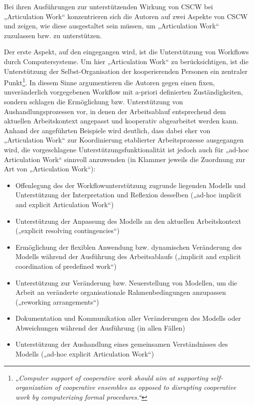 Bei ihren Ausführungen zur unterstützenden Wirkung von \gls{CSCW} bei „Articulation Work“ konzentrieren sich die Autoren auf zwei Aspekte von \gls{CSCW} und zeigen, wie diese ausgestaltet sein müssen, um „Articulation Work“ zuzulassen bzw. zu unterstützen. 

Der erste Aspekt, auf den eingegangen wird, ist die Unterstützung von Workflows durch Computersysteme. Um hier „Articulation Work“ zu berücksichtigen, ist die Unterstützung der Selbst-Organisation der kooperierenden Personen ein zentraler Punkt\footnote{\emph{„Computer support of cooperative work should aim at supporting self-organization of cooperative ensembles as opposed to disrupting cooperative work by computerizing formal procedures.“}\citep[][S. 17]{Schmidt92}}. In diesem Sinne argumentieren die Autoren gegen einen fixen, unveränderlich vorgegebenen Workflow mit a-priori definierten Zuständigkeiten, sondern schlagen die Ermöglichung bzw. Unterstützung von Aushandlungsprozessen vor, in denen der Arbeitsablauf entsprechend dem aktuellen Arbeitskontext angepasst und kooperativ abgearbeitet werden kann. Anhand der angeführten Beispiele wird deutlich, dass dabei eher von „Articulation Work“ zur Koordinierung etablierter Arbeitsprozesse ausgegangen wird, die vorgeschlagene Unterstützungsfunktionalität ist jedoch auch für „ad-hoc Articulation Work“ sinnvoll anzuwenden (in Klammer jeweils die Zuordnung zur Art von „Articulation Work“):
\begin{itemize}
	\item Offenlegung des der Workflowunterstützung zugrunde liegenden Modells und Unterstützung der Interpretation und Reflexion desselben („ad-hoc implicit and explicit Articulation Work“)
	\item Unterstützung der Anpassung des Modells an den aktuellen Arbeitskontext („explicit resolving contingencies“)
	\item Ermöglichung der flexiblen Anwendung bzw. dynamischen Veränderung des Modells während der Ausführung des Arbeitsablaufs („implicit and explicit coordination of predefined work“)
	\item Unterstützung zur Veränderung bzw. Neuerstellung von Modellen, um die Arbeit an veränderte organisationale Rahmenbedingungen anzupassen („reworking arrangements“)
	\item Dokumentation und Kommunikation aller Veränderungen des Modells oder Abweichungen während der Ausführung (in allen Fällen)
	\item Unterstützung der Aushandlung eines gemeinsamen Verständnisses des Modells („ad-hoc explicit Articulation Work“)
\end{itemize}

